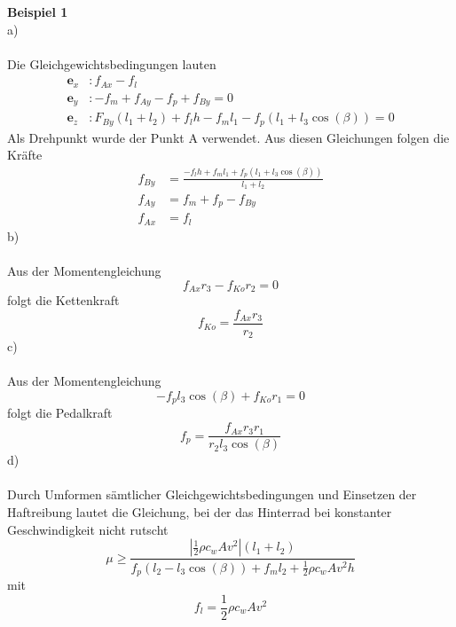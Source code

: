\textbf{Beispiel 1}\\
a)\\ \\
Die Gleichgewichtsbedingungen lauten
\begin{align*}
	\textbf{e}_x &: f_{Ax} - f_l\\
	\textbf{e}_y &: -f_m + f_{Ay} - f_p + f_{By} = 0\\
	\textbf{e}_z &: F_{By}(l_1 + l_2) + f_lh - f_ml_1 - f_p(l_1 + l_3\cos(\beta)) = 0
\end{align*}
Als Drehpunkt wurde der Punkt A verwendet. Aus diesen Gleichungen folgen die Kräfte
\begin{align*}
	f_{By} &= \frac{-f_lh + f_ml_1 + f_p(l_1 + l_3\cos(\beta))}{l_1 + l_2} \\
	f_{Ay} &= f_m + f_p - f_{By} \\
	f_{Ax} &= f_l
\end{align*}
b)\\ \\
Aus der Momentengleichung
\[
	f_{Ax}r_3 - f_{Ko}r_2 = 0
\]
folgt die Kettenkraft
\[
	f_{Ko} = \frac{f_{Ax}r_3}{r_2}
\]
c)\\ \\
Aus der Momentengleichung
\[
	-f_pl_3\cos(\beta) + f_{Ko}r_1 = 0
\]
folgt die Pedalkraft
\[
	f_p = \frac{f_{Ax}r_3r_1}{r_2l_3\cos(\beta)}
\]
d)\\ \\
Durch Umformen sämtlicher Gleichgewichtsbedingungen und Einsetzen der Haftreibung lautet die Gleichung, bei der das Hinterrad bei konstanter Geschwindigkeit nicht rutscht
\[
	\mu \geq \frac{|\frac{1}{2}\rho c_wAv^2|(l_1 + l_2)}{f_p(l_2 - l_3\cos(\beta)) + f_ml_2 + \frac{1}{2}\rho c_wAv^2h}
\]
mit 
\[
	f_l = \frac{1}{2}\rho c_wAv^2
\]